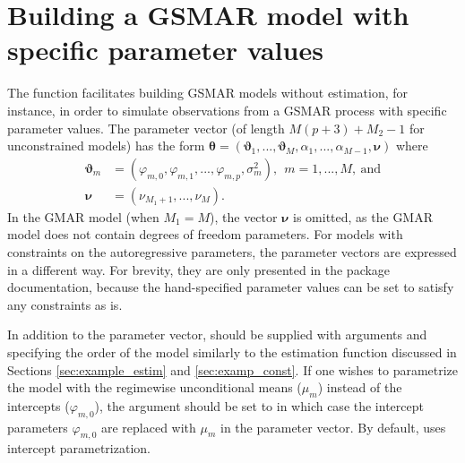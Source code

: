 \documentclass[nojss]{jss} %
\begin{document}
\section{Building a GSMAR model with specific parameter values}\label{sec:GSMAR}

The function  facilitates building GSMAR models without estimation, for instance, in order to simulate observations from a GSMAR process with specific parameter values. The parameter vector (of length $M(p+3)+M_2-1$ for unconstrained models) has the form $\boldsymbol{\theta} = (\boldsymbol{\vartheta}_1,...,\boldsymbol{\vartheta}_M,\alpha_1,...,\alpha_{M-1},\boldsymbol{\nu})$ where
\begin{align}
\boldsymbol{\vartheta}_m &= (\varphi_{m,0},\varphi_{m,1},...,\varphi_{m,p},\sigma^2_m),\ \ m=1,...,M, \ \text{and}  \\
\boldsymbol{\nu} &= (\nu_{M_1+1},...,\nu_M).
\end{align}
%
In the GMAR model (when $M_1=M$), the vector $\boldsymbol{\nu}$ is omitted, as the GMAR model does not contain degrees of freedom parameters. For models with constraints on the autoregressive parameters, the parameter vectors are expressed in a different way. For brevity, they are only presented in the package documentation, because the hand-specified parameter values can be set to satisfy any constraints as is.

In addition to the parameter vector,  should be supplied with arguments  and  specifying the order of the model similarly to the estimation function  discussed in Sections \ref{sec:example_estim} and \ref{sec:examp_const}. If one wishes to parametrize the model with the regimewise unconditional means ($\mu_m$) instead of the intercepts ($\varphi_{m,0}$), the argument  should be set to  in which case the intercept parameters $\varphi_{m,0}$ are replaced with $\mu_m$ in the parameter vector. By default,  uses intercept parametrization.
\end{document}
